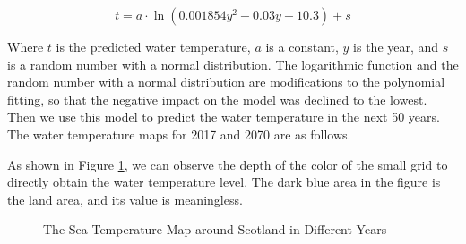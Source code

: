 \documentclass{mcmthesis}
\numberwithin{figure}{section}
\numberwithin{table}{section}
\begin{document}
\begin{equation}\label{2}
  t = a \cdot \ln (0.001854 y^2 - 0.03 y + 10.3) + s
  \end{equation}

Where $t$ is the predicted water temperature, $a$ is a constant, $y$ is the year, and $s$ is a random number with a normal distribution. The logarithmic function and the random number with a normal distribution are modifications to the polynomial fitting, so that the negative impact on the model was declined to the lowest. Then we use this model to predict the water temperature in the next 50 years. The water temperature maps for 2017 and 2070 are as follows.

As shown in Figure \ref{SeaT}, we can observe the depth of the color of the small grid to directly obtain the water temperature level. The dark blue area in the figure is the land area, and its value is meaningless.

\begin{figure}[H]

  \centering
  
  
  \hspace{1in}
  
  
  \caption{The Sea Temperature Map around Scotland in Different Years}
  
  \label{SeaT} %
  
  \end{figure}
\end{document}
